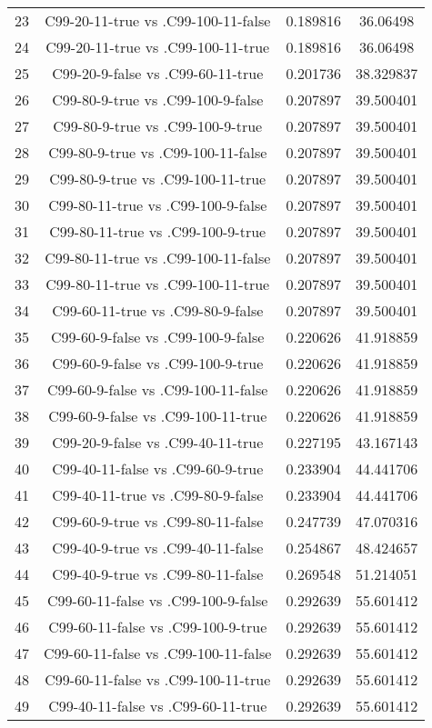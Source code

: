 \documentclass[a4paper,10pt]{article}
\begin{document}
\begin{landscape}
\begin{table}[!htp]
\begin{tabular}{cccc}
23&C99-20-11-true vs .C99-100-11-false&0.189816&36.06498\\
24&C99-20-11-true vs .C99-100-11-true&0.189816&36.06498\\
25&C99-20-9-false vs .C99-60-11-true&0.201736&38.329837\\
26&C99-80-9-true vs .C99-100-9-false&0.207897&39.500401\\
27&C99-80-9-true vs .C99-100-9-true&0.207897&39.500401\\
28&C99-80-9-true vs .C99-100-11-false&0.207897&39.500401\\
29&C99-80-9-true vs .C99-100-11-true&0.207897&39.500401\\
30&C99-80-11-true vs .C99-100-9-false&0.207897&39.500401\\
31&C99-80-11-true vs .C99-100-9-true&0.207897&39.500401\\
32&C99-80-11-true vs .C99-100-11-false&0.207897&39.500401\\
33&C99-80-11-true vs .C99-100-11-true&0.207897&39.500401\\
34&C99-60-11-true vs .C99-80-9-false&0.207897&39.500401\\
35&C99-60-9-false vs .C99-100-9-false&0.220626&41.918859\\
36&C99-60-9-false vs .C99-100-9-true&0.220626&41.918859\\
37&C99-60-9-false vs .C99-100-11-false&0.220626&41.918859\\
38&C99-60-9-false vs .C99-100-11-true&0.220626&41.918859\\
39&C99-20-9-false vs .C99-40-11-true&0.227195&43.167143\\
40&C99-40-11-false vs .C99-60-9-true&0.233904&44.441706\\
41&C99-40-11-true vs .C99-80-9-false&0.233904&44.441706\\
42&C99-60-9-true vs .C99-80-11-false&0.247739&47.070316\\
43&C99-40-9-true vs .C99-40-11-false&0.254867&48.424657\\
44&C99-40-9-true vs .C99-80-11-false&0.269548&51.214051\\
45&C99-60-11-false vs .C99-100-9-false&0.292639&55.601412\\
46&C99-60-11-false vs .C99-100-9-true&0.292639&55.601412\\
47&C99-60-11-false vs .C99-100-11-false&0.292639&55.601412\\
48&C99-60-11-false vs .C99-100-11-true&0.292639&55.601412\\
49&C99-40-11-false vs .C99-60-11-true&0.292639&55.601412\\

\end{tabular}
\end{table}
\end{landscape}
\end{document}
